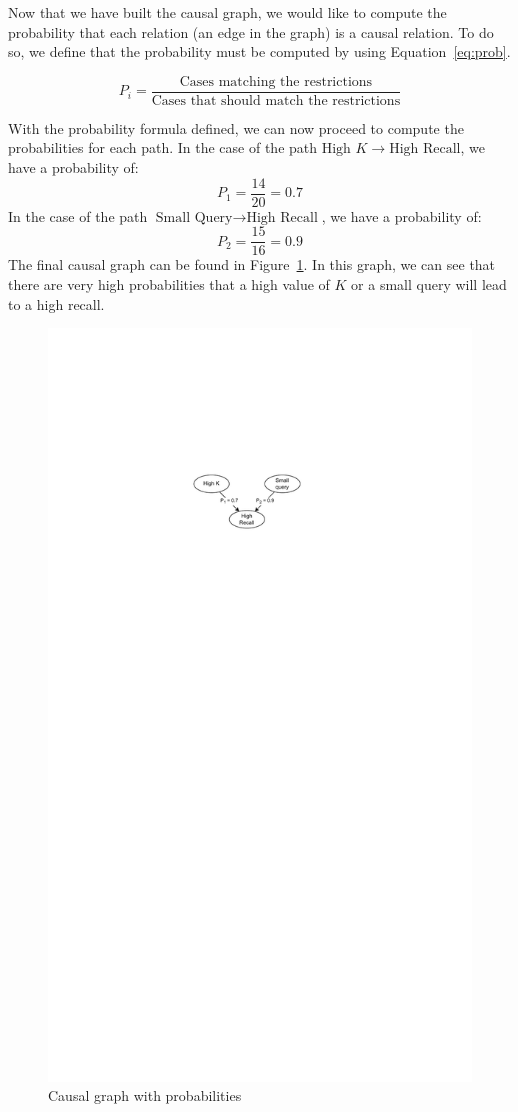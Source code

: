 \noindent Now that we have built the causal graph, we would like to compute the probability that each relation (an edge in the graph) is a causal relation.
To do so, we define that the probability must be computed by using Equation~\ref{eq:prob}.

\begin{equation}
    P_i = \frac{\text{Cases matching the restrictions}}{\text{Cases that should match the restrictions}}
    \label{eq:prob}
\end{equation}

\noindent With the probability formula defined, we can now proceed to compute the probabilities for each path.
In the case of the path $\text{High $K$} \rightarrow \text{High Recall}$, we have a probability of:
\[P_1 = \frac{14}{20} = 0.7\]
In the case of the path $\text{Small Query} \rightarrow \text{High Recall}$, we have a probability of:
\[P_2 = \frac{15}{16} = 0.9\]
The final causal graph can be found in Figure~\ref{fig:rec-probs}.
In this graph, we can see that there are very high probabilities that a high value of $K$ or a small query will lead to a high recall.

\begin{figure}[!h]
    \begin{center}
        \includegraphics[width=0.3\linewidth]{assets/pdf/evaluation/dag-rec-probs}
    \end{center}

    \caption{Causal graph with probabilities}
    \label{fig:rec-probs}
\end{figure}


